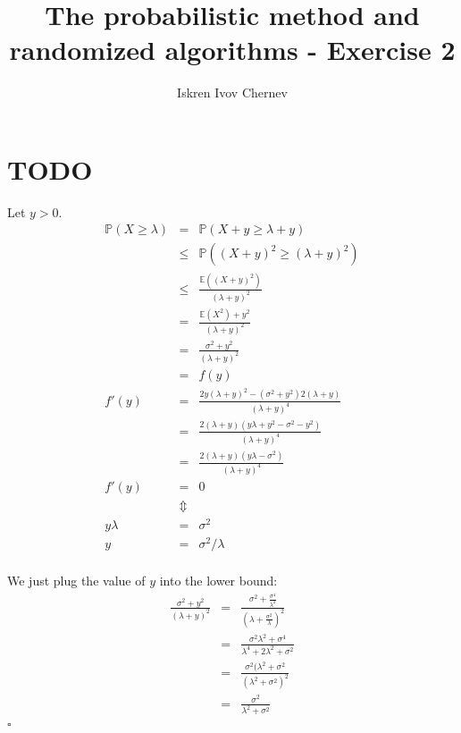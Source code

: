 \documentclass[a4paper]{article}
\begin{document}
\title{The probabilistic method and randomized algorithms - Exercise 2}
\author{Iskren Ivov Chernev}
\maketitle

\def\sm{\mathrm{sm}}
\def\P{\mathbb{P}}
\def\E{\mathbb{E}}
\def\irv{i.r.v.\;}
\def\rv{r.v.\;}
\def\FMM{F.M.M.\;}
\def\endproof{$\square$}
\def\Var{\mathrm{Var}}
\def\Cov{\mathrm{Cov}}
\def\CS{\mathrm{CS}}
\def\CCS{\mathrm{CCS}}
\newcommand{\bfrac}[2] {\left(\frac{#1}{#2}\right)}
\newcommand{\B}[1] {\left(#1\right)}

\section{TODO}

Let $ y > 0 $.
\begin{eqnarray*}
  \P(X \ge \lambda) &=& \P(X + y \ge \lambda + y) \\
    &\le& \P((X + y)^2 \ge (\lambda + y)^2) \\
    &\le& \frac{\E((X + y)^2)}{(\lambda + y)^2} \\
    &=& \frac{\E(X^2) + y^2}{(\lambda + y)^2} \\
    &=& \frac{\sigma^2 + y^2}{(\lambda + y)^2} \\
    &=& f(y) \\
  f'(y) &=& \frac{2y(\lambda + y)^2 - (\sigma^2 + y^2)2(\lambda + y)}{(\lambda + y)^4} \\
    &=& \frac{2(\lambda + y)(y\lambda + y^2 - \sigma^2 - y^2)}{(\lambda + y)^4} \\
    &=&  \frac{2(\lambda + y)(y\lambda - \sigma^2)}{(\lambda + y)^4} \\
  f'(y) &=& 0 \\
   &\Updownarrow& \\
  y\lambda &=& \sigma^2 \\
  y &=& \sigma^2 / \lambda \\
\end{eqnarray*}

We just plug the value of $ y $ into the lower bound:
\begin{eqnarray*}
  \frac{\sigma^2 + y^2}{(\lambda + y)^2}
    &=& \frac{\sigma^2 + \frac{\sigma^4}{\lambda^2}}{(\lambda + \frac{\sigma^2}{\lambda})^2} \\
    &=& \frac{\sigma^2\lambda^2 + \sigma^4}{\lambda^4 + 2\lambda^2 + \sigma^2} \\
    &=& \frac{\sigma^2(\lambda^2 + \sigma^2}{(\lambda^2 + \sigma^2)^2} \\
    &=& \frac{\sigma^2}{\lambda^2 + \sigma^2} \\
\end{eqnarray*}
\endproof
\end{document}
